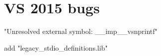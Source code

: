 
\section{VS 2015 bugs}
"Unresolved external symbol: __imp__vsnprintf"

add "legacy_stdio_definitions.lib"